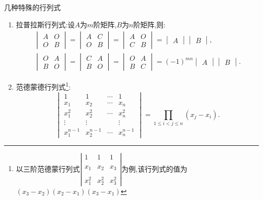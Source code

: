 \documentclass[8pt a4paper, oneside, UTF8]{ctexbook}
\begin{document}
\begin{sloppypar}
\begin{criterion}{几种特殊的行列式}{}
\begin{enumerate}
            \item 拉普拉斯行列式:设$A$为$m$阶矩阵,$B$为$n$阶矩阵,则:$$\begin{gathered}\begin{vmatrix}A&O\\O&B\end{vmatrix}=\begin{vmatrix}A&C\\O&B\end{vmatrix}=\begin{vmatrix}A&O\\C&B\end{vmatrix}=\begin{vmatrix}A\end{vmatrix}\begin{vmatrix}B\end{vmatrix},\\\begin{vmatrix}O&A\\B&O\end{vmatrix}=\begin{vmatrix}C&A\\B&O\end{vmatrix}=\begin{vmatrix}O&A\\B&C\end{vmatrix}=(-1)^{mn}\begin{vmatrix}A\end{vmatrix}\begin{vmatrix}B\end{vmatrix} .\end{gathered}$$
            \item 范德蒙德行列式\footnote{以三阶范德蒙行列式$\left.\left|\begin{array}{cccc}1&1&1\\\\x_1&x_2&x_3\\\\x_1^2&x_2^2&x_3^2\end{array}\right.\right|$为例,该行列式的值为$(x_3-x_2)(x_2-x_1)(x_3-x_1)$}:$$\begin{vmatrix}1&1&\cdots&1\\x_1&x_2&\cdots&x_n\\x_1^2&x_2^2&\cdots&x_n^2\\\vdots&\vdots&&\vdots\\x_1^{n-1}&x_2^{n-1}&\cdots&x_n^{n-1}\end{vmatrix}=\prod_{1\leqslant i<j\leqslant n}(x_j-x_i).$$
        \end{enumerate}
    \end{criterion}

\end{sloppypar}
\end{document}
